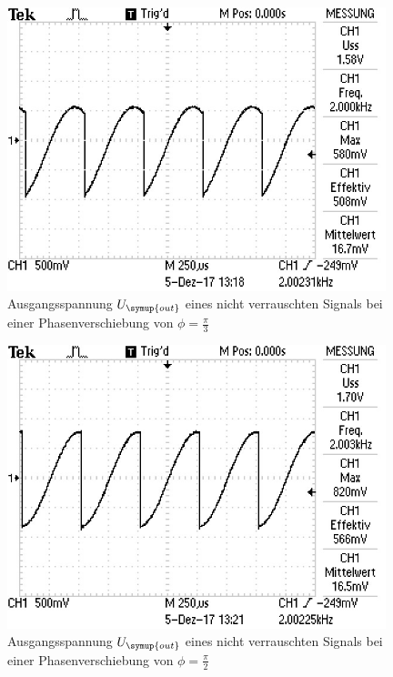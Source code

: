 \begin{figure}
  \centering
  \includegraphics[width=11cm]{data/phase_60.jpg}
  \caption{Ausgangsspannung $U_{\symup{out}}$ eines nicht verrauschten Signals bei einer Phasenverschiebung
  von $\phi=\frac{\pi}{3}$}
  \label{fig:phase_60}
\end{figure}

\begin{figure}
  \centering
  \includegraphics[width=11cm]{data/phase_90.jpg}
  \caption{Ausgangsspannung $U_{\symup{out}}$ eines nicht verrauschten Signals bei einer Phasenverschiebung
  von $\phi=\frac{\pi}{2}$}
  \label{fig:phase_0}
\end{figure}





